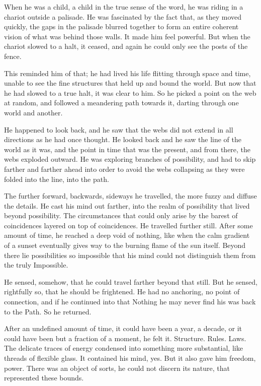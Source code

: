 When he was a child, a child in the true sense of the word, he was riding in a chariot outside a palisade. He was fascinated by the fact that, as they moved quickly, the gaps in the palisade blurred together to form an entire coherent vision of what was behind those walls. It made him feel powerful. But when the chariot slowed to a halt, it ceased, and again he could only see the posts of the fence.

This reminded him of that; he had lived his life flitting through space and time, unable to see the fine structures that held up and bound the world. But now that he had slowed to a true halt, it was clear to him. So he picked a point on the web at random, and followed a meandering path towards it, darting through one world and another.

He happened to look back, and he saw that the webs did not extend in all directions as he had once thought. He looked back and he saw the line of the world as it was, and the point in time that was the present, and from there, the webs exploded outward. He was exploring branches of possibility, and had to skip farther and farther ahead into order to avoid the webs collapsing as they were folded into the line, into the path.

The further forward, backwards, sideways he travelled, the more fuzzy and diffuse the details. He cast his mind out farther, into the realm of possibility that lived beyond possibility. The circumstances that could only arise by the barest of coincidences layered on top of coincidences. He travelled further still. After some amount of time, he reached a deep void of nothing, like when the calm gradient of a sunset eventually gives way to the burning flame of the sun itself. Beyond there lie possibilities so impossible that his mind could not distinguish them from the truly Impossible.

He sensed, somehow, that he could travel farther beyond that still. But he sensed, rightfully so, that he should be frightened. He had no anchoring, no point of connection, and if he continued into that Nothing he may never find his was back to the Path. So he returned.

After an undefined amount of time, it could have been a year, a decade, or it could have been but a fraction of a moment, he felt it. Structure. Rules. Laws. The delicate traces of energy condensed into something more substantial, like threads of flexible glass. It contained his mind, yes. But it also gave him freedom, power. There was an object of sorts, he could not discern its nature, that represented these bounds.

